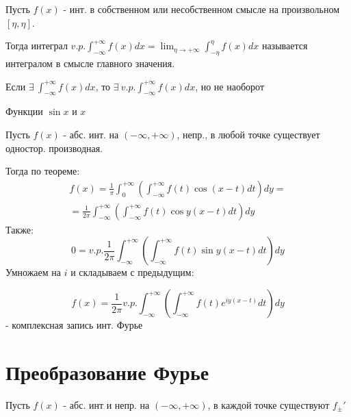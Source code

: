 \documentclass{article}
\begin{document}
\begin{definition}
  Пусть $f(x)$ - инт. в собственном или несобственном смысле на произвольном $[\eta,\eta]$.

  Тогда интеграл $v.p.\int_{-\infty}^{+\infty}f(x)dx=\lim_{\eta \to +\infty}\int_{-\eta}^{\eta}f(x)dx$
  называется интегралом в смысле главного значения.
\end{definition}
\begin{remark}
  Если $\exists \ \int_{-\infty}^{+\infty}f(x)dx$, то $\exists \ v.p. \int_{-\infty}^{+\infty}f(x)dx$, но не наоборот
\end{remark}
\begin{eg}
  Функции $\sin x$ и $x$
\end{eg}
Пусть $f(x)$ - абс. инт. на $(-\infty,+\infty)$, непр., в любой точке существует одностор. производная.

Тогда по теореме:
\begin{gather*}
  f(x)=\frac{1}{\pi}\int_{0}^{+\infty}\left(\int_{-\infty}^{+\infty}f(t)\cos(x-t)dt\right)dy = \\ 
  = \frac{1}{2\pi}\int_{-\infty}^{+\infty}\left(\int_{-\infty}^{+\infty}f(t)\cos y (x-t)dt\right)dy
\end{gather*}
Также:
\[
  0=v.p.\frac{1}{2\pi}\int_{-\infty}^{+\infty}\left(\int_{-\infty}^{+\infty}f(t)\sin y(x-t)dt\right)dy
\]
Умножаем на $i$ и складываем с предыдущим:
\begin{definition}
\[
  f(x)=\frac{1}{2\pi}v.p. \int_{-\infty}^{+\infty}\left(\int_{-\infty}^{+\infty}f(t)e^{iy(x-t)}dt\right)dy \tag{0}
\]
- комплексная запись инт. Фурье
\end{definition}

\section{Преобразование Фурье}
Пусть $f(x)$ - абс. инт и непр. на $(-\infty,+\infty)$, в каждой точке существуют $f_{\pm}'$
\end{document}
